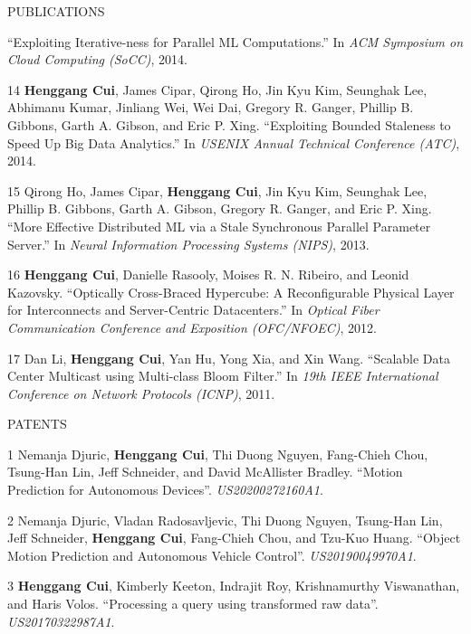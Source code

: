 \documentclass{resume} %
\begin{document}
\begin{rSection}{PUBLICATIONS}
{        ``Exploiting Iterative-ness for Parallel ML Computations.''
        In \emph{ACM Symposium on Cloud Computing (SoCC)}, 2014.
    \item
    [14]
        {\bf Henggang Cui}, James Cipar, Qirong Ho, Jin Kyu Kim, Seunghak Lee, Abhimanu Kumar, Jinliang Wei, Wei Dai, Gregory R. Ganger, Phillip B. Gibbons, Garth A. Gibson, and Eric P. Xing.
        ``Exploiting Bounded Staleness to Speed Up Big Data Analytics.''
        In \emph{USENIX Annual Technical Conference (ATC)}, 2014.
    \item
    [15]
        Qirong Ho, James Cipar, {\bf Henggang Cui}, Jin Kyu Kim, Seunghak Lee, Phillip B. Gibbons, Garth A. Gibson, Gregory R. Ganger, and Eric P. Xing.
        ``More Effective Distributed ML via a Stale Synchronous Parallel Parameter Server.''
        In \emph{Neural Information Processing Systems (NIPS)}, 2013.
    \item
    [16]
        {\bf Henggang Cui}, Danielle Rasooly, Moises R. N. Ribeiro, and Leonid Kazovsky.
        ``Optically Cross-Braced Hypercube: A Reconfigurable Physical Layer for Interconnects and Server-Centric Datacenters.''
        In \emph{Optical Fiber Communication Conference and Exposition (OFC/NFOEC)}, 2012.
    \item
    [17]
        Dan Li, {\bf Henggang Cui}, Yan Hu, Yong Xia, and Xin Wang.
        ``Scalable Data Center Multicast using Multi-class Bloom Filter.''
        In \emph{19th IEEE International Conference on Network Protocols (ICNP)}, 2011.
}
\end{rSection}
\vspace{-.05in}



\begin{rSection}{PATENTS}
\vspace{-.1in}
\footnotesize{
    \item
    [1]
        Nemanja Djuric, {\bf Henggang Cui}, Thi Duong Nguyen, Fang-Chieh Chou, Tsung-Han Lin, Jeff Schneider, and David McAllister Bradley.
        ``Motion Prediction for Autonomous Devices''.
        \emph{US20200272160A1}.
    \item
    [2]
        Nemanja Djuric, Vladan Radosavljevic, Thi Duong Nguyen, Tsung-Han Lin, Jeff Schneider, {\bf Henggang Cui}, Fang-Chieh Chou, and Tzu-Kuo Huang.
        ``Object Motion Prediction and Autonomous Vehicle Control''.
        \emph{US20190049970A1}.
    \item
    [3]
        {\bf Henggang Cui}, Kimberly Keeton, Indrajit Roy, Krishnamurthy Viswanathan, and Haris Volos.
        ``Processing a query using transformed raw data''.
        \emph{US20170322987A1}.
}
\end{rSection}
\vspace{-.05in}
\end{document}
